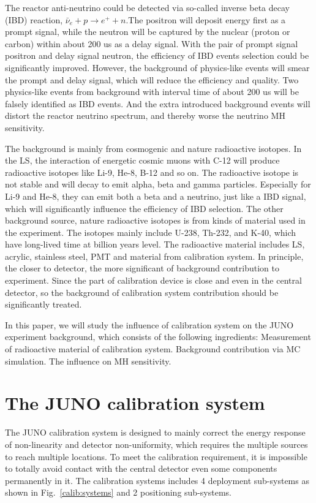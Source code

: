 \documentclass[review,number,sort&compress]{elsarticle}
\begin{document}
The reactor anti-neutrino could be detected via so-called inverse beta decay (IBD) reaction, $\bar{\nu}_{e}+p \rightarrow e^{+}+n $.The positron will deposit energy first as a prompt signal, while the neutron will be captured by the nuclear (proton or carbon) within about 200 us as a delay signal. 
With the pair of prompt signal positron and delay signal neutron, the efficiency of IBD events selection could be significantly improved. 
However, the background of physics-like events will smear the prompt and delay signal, which will reduce the efficiency and quality.
Two physics-like events from background with interval time of about 200 us will be falsely identified as IBD events.
And the extra introduced background events will distort the reactor neutrino spectrum, and thereby worse the neutrino MH sensitivity. 

The background is mainly from cosmogenic and nature radioactive isotopes.
In the LS, the interaction of energetic cosmic muons with C-12 will produce radioactive isotopes like Li-9, He-8, B-12 and so on.
The radioactive isotope is not stable and will decay to emit alpha, beta and gamma particles.
Especially for Li-9 and He-8, they can emit both a beta and a neutrino, just like a IBD signal, which will significantly influence the efficiency of IBD selection.  
The other background source, nature radioactive isotopes is from kinds of material used in the experiment.
The isotopes mainly include U-238, Th-232, and K-40, which have long-lived time at billion years level.
The radioactive material includes LS, acrylic, stainless steel, PMT and material from calibration system.
In principle, the closer to detector, the more significant of background contribution to experiment.
Since the part of calibration device is close and even in the central detector, so the background of calibration system contribution should be significantly treated. 

In this paper, we will study the influence of calibration system on the JUNO experiment background, which consists of the following ingredients: 
\noindent
Measurement of radioactive material of calibration system.
\noindent
Background contribution via MC simulation.
\noindent
The influence on MH sensitivity.

\section{The JUNO calibration system}

The JUNO calibration system is designed 
to mainly correct the energy response of non-linearity 
and detector non-uniformity, which requires the multiple 
sources to reach multiple locations.
To meet the calibration requirement, it is impossible to totally avoid contact with the central detector even some components permanently in it.
The calibration systems includes 4 deployment sub-systems as shown in Fig.~\ref{calib:systems} and 2 positioning sub-systems. 
\end{document}
